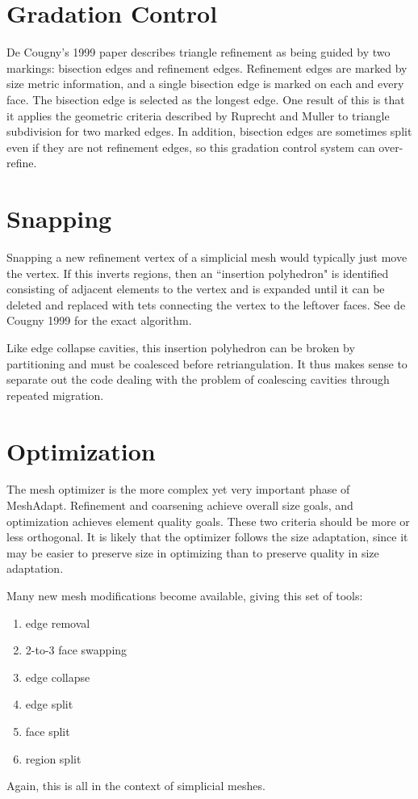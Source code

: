 \documentclass{article}
\begin{document}
\section{Gradation Control}

De Cougny's 1999 paper describes triangle refinement as being
guided by two markings: bisection edges and refinement edges.
Refinement edges are marked by size metric information,
and a single bisection edge is marked on each and every face.
The bisection edge is selected as the longest edge.
One result of this is that it applies the geometric
criteria described by Ruprecht and Muller to triangle
subdivision for two marked edges.
In addition, bisection edges are sometimes split even if
they are not refinement edges, so this gradation control
system can over-refine.

\section{Snapping}

Snapping a new refinement vertex of a simplicial mesh
would typically just move the vertex.
If this inverts regions, then an ``insertion polyhedron"
is identified consisting of adjacent elements to the
vertex and is expanded until it can be deleted and
replaced with tets connecting the vertex to the leftover
faces.
See de Cougny 1999 for the exact algorithm.

Like edge collapse cavities, this insertion polyhedron 
can be broken by partitioning and must be coalesced
before retriangulation.
It thus makes sense to separate out the code
dealing with the problem of coalescing cavities
through repeated migration.

\section{Optimization}

The mesh optimizer is the more complex yet very important
phase of MeshAdapt.
Refinement and coarsening achieve overall size goals, and
optimization achieves element quality goals.
These two criteria should be more or less orthogonal.
It is likely that the optimizer follows the size adaptation,
since it may be easier to preserve size in optimizing
than to preserve quality in size adaptation.

Many new mesh modifications become available, giving this
set of tools:
\begin{enumerate}
\item edge removal
\item 2-to-3 face swapping
\item edge collapse
\item edge split
\item face split
\item region split
\end{enumerate}
Again, this is all in the context of simplicial meshes.
\end{document}
